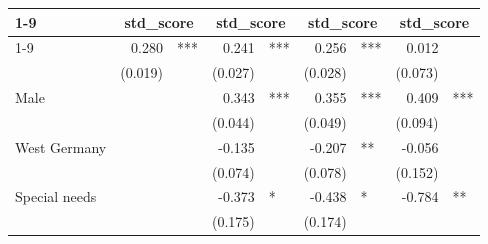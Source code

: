 \documentclass{article}
\begin{document}
\begin{table}[!h]
\centering
\begin{tabular}{lllllllll}
\cline{1-9}
\multicolumn{1}{r}{} &
  \multicolumn{2}{c}{std\_score} &
  \multicolumn{2}{c}{std\_score} &
  \multicolumn{2}{c}{std\_score} &
  \multicolumn{2}{c}{std\_score} \\
\cline{1-9}
\multicolumn{1}{l}{Class size} &
  \multicolumn{1}{r}{0.280} &
  \multicolumn{1}{l}{***} &
  \multicolumn{1}{r}{0.241} &
  \multicolumn{1}{l}{***} &
  \multicolumn{1}{r}{0.256} &
  \multicolumn{1}{l}{***} &
  \multicolumn{1}{r}{0.012} &
  \multicolumn{1}{l}{} \\
\multicolumn{1}{l}{} &
  \multicolumn{1}{r}{(0.019)} &
  \multicolumn{1}{l}{} &
  \multicolumn{1}{r}{(0.027)} &
  \multicolumn{1}{l}{} &
  \multicolumn{1}{r}{(0.028)} &
  \multicolumn{1}{l}{} &
  \multicolumn{1}{r}{(0.073)} &
  \multicolumn{1}{l}{} \\
\multicolumn{1}{l}{Male} &
  \multicolumn{1}{r}{} &
  \multicolumn{1}{l}{} &
  \multicolumn{1}{r}{0.343} &
  \multicolumn{1}{l}{***} &
  \multicolumn{1}{r}{0.355} &
  \multicolumn{1}{l}{***} &
  \multicolumn{1}{r}{0.409} &
  \multicolumn{1}{l}{***} \\
\multicolumn{1}{l}{} &
  \multicolumn{1}{r}{} &
  \multicolumn{1}{l}{} &
  \multicolumn{1}{r}{(0.044)} &
  \multicolumn{1}{l}{} &
  \multicolumn{1}{r}{(0.049)} &
  \multicolumn{1}{l}{} &
  \multicolumn{1}{r}{(0.094)} &
  \multicolumn{1}{l}{} \\
\multicolumn{1}{l}{West Germany} &
  \multicolumn{1}{r}{} &
  \multicolumn{1}{l}{} &
  \multicolumn{1}{r}{-0.135} &
  \multicolumn{1}{l}{} &
  \multicolumn{1}{r}{-0.207} &
  \multicolumn{1}{l}{**} &
  \multicolumn{1}{r}{-0.056} &
  \multicolumn{1}{l}{} \\
\multicolumn{1}{l}{} &
  \multicolumn{1}{r}{} &
  \multicolumn{1}{l}{} &
  \multicolumn{1}{r}{(0.074)} &
  \multicolumn{1}{l}{} &
  \multicolumn{1}{r}{(0.078)} &
  \multicolumn{1}{l}{} &
  \multicolumn{1}{r}{(0.152)} &
  \multicolumn{1}{l}{} \\
\multicolumn{1}{l}{Special needs} &
  \multicolumn{1}{r}{} &
  \multicolumn{1}{l}{} &
  \multicolumn{1}{r}{-0.373} &
  \multicolumn{1}{l}{*} &
  \multicolumn{1}{r}{-0.438} &
  \multicolumn{1}{l}{*} &
  \multicolumn{1}{r}{-0.784} &
  \multicolumn{1}{l}{**} \\
\multicolumn{1}{l}{} &
  \multicolumn{1}{r}{} &
  \multicolumn{1}{l}{} &
  \multicolumn{1}{r}{(0.175)} &
  \multicolumn{1}{l}{} &
  \multicolumn{1}{r}{(0.174)} &
  \multicolumn{1}{l}{} &

\end{tabular}
\end{table}
\end{document}
